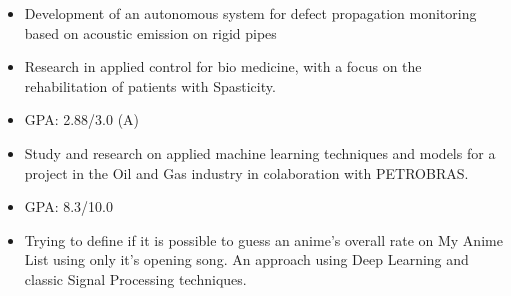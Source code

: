 \documentclass[10pt,a4paper,ragged2e,withhyper]{altacv}
\begin{document}
\begin{paracol}{2}
            \begin{itemize}
                \item Development of an autonomous system for defect propagation monitoring based on acoustic emission on rigid pipes
            \end{itemize}
            \divider
            \newpage
            \begin{itemize}
                \item Research in applied control for bio medicine, with a focus on the rehabilitation of patients with Spasticity.
            \end{itemize}
            \divider
        
            \begin{itemize}
                \item GPA: 2.88/3.0 (A)
                \item Study and research on applied machine learning techniques and models for a project in the Oil and Gas industry in colaboration with PETROBRAS.
            \end{itemize}
            \divider
            
            \begin{itemize}
                \item GPA: 8.3/10.0
            \end{itemize}
        
            \begin{itemize}
                \item Trying to define if it is possible to guess an anime's overall rate on My Anime List using only it's opening song. An approach using Deep Learning and classic Signal Processing techniques.
            \end{itemize}
            \divider
            

\end{paracol}
\end{document}
